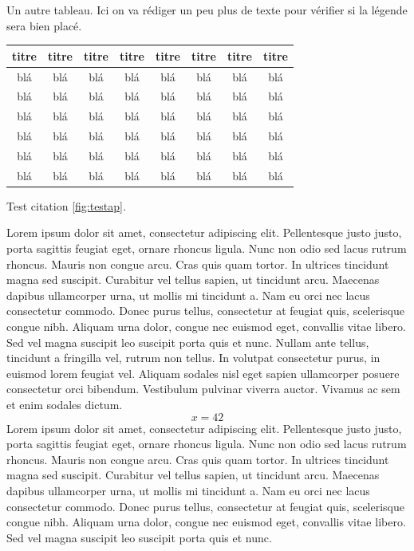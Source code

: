 \documentclass[letterpaper, twoside, 12pt, memoire, creativecommons, hyperref]{thETS}
\begin{document}
\begin{tableap}[*ht]
	\caption{Un autre tableau. Ici on va rédiger un peu plus de texte pour vérifier si la légende sera bien placé.}
		\begin{tabular}{|c|c|c|c|c|c|c|c|}
		\hline
			{\bf titre} & {\bf titre} & {\bf titre} & {\bf titre} & {\bf titre} & {\bf titre} & {\bf titre} & {\bf titre} \\
	  \hline
			blá & blá & blá & blá & blá & blá & blá & blá \\
	  \hline
			blá & blá & blá & blá & blá & blá & blá & blá \\
	  \hline
			blá & blá & blá & blá & blá & blá & blá & blá \\
	  \hline
			blá & blá & blá & blá & blá & blá & blá & blá \\
	  \hline
			blá & blá & blá & blá & blá & blá & blá & blá \\
	  \hline
			blá & blá & blá & blá & blá & blá & blá & blá \\
	  \hline
		\end{tabular}
	\label{tab:tableau_annexe}
\end{tableap}

Test citation \ref{fig:testap}.

Lorem ipsum dolor sit amet, consectetur adipiscing elit. Pellentesque justo justo, porta sagittis feugiat eget, ornare rhoncus ligula. Nunc non odio sed lacus rutrum rhoncus. Mauris non congue arcu. Cras quis quam tortor. In ultrices tincidunt magna sed suscipit. Curabitur vel tellus sapien, ut tincidunt arcu. Maecenas dapibus ullamcorper urna, ut mollis mi tincidunt a. Nam eu orci nec lacus consectetur commodo. Donec purus tellus, consectetur at feugiat quis, scelerisque congue nibh. Aliquam urna dolor, congue nec euismod eget, convallis vitae libero. Sed vel magna suscipit leo suscipit porta quis et nunc. Nullam ante tellus, tincidunt a fringilla vel, rutrum non tellus. In volutpat consectetur purus, in euismod lorem feugiat vel. Aliquam sodales nisl eget sapien ullamcorper posuere consectetur orci bibendum. Vestibulum pulvinar viverra auctor. Vivamus ac sem et enim sodales dictum.
\begin{equation}
x = 42
\end{equation} 
Lorem ipsum dolor sit amet, consectetur adipiscing elit. Pellentesque justo justo, porta sagittis feugiat eget, ornare rhoncus ligula. Nunc non odio sed lacus rutrum rhoncus. Mauris non congue arcu. Cras quis quam tortor. In ultrices tincidunt magna sed suscipit. Curabitur vel tellus sapien, ut tincidunt arcu. Maecenas dapibus ullamcorper urna, ut mollis mi tincidunt a. Nam eu orci nec lacus consectetur commodo. Donec purus tellus, consectetur at feugiat quis, scelerisque congue nibh. Aliquam urna dolor, congue nec euismod eget, convallis vitae libero. Sed vel magna suscipit leo suscipit porta quis et nunc.
\end{document}
